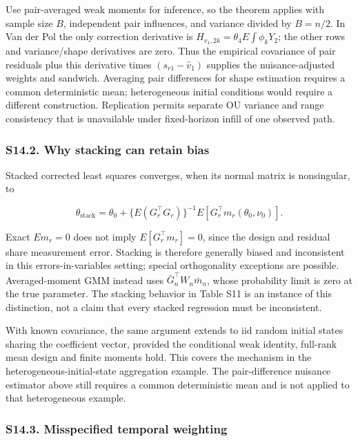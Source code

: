 \documentclass[
  11pt,
]{article}
\begin{document}
Use pair-averaged weak moments for inference, so the theorem applies
with sample size \(B\), independent pair influences, and variance
divided by \(B=n/2\). In Van der Pol the only correction derivative is
\(H_{v_1,2k}=\theta_4 E\int\phi_k Y_2\); the other rows and
variance/shape derivatives are zero. Thus the empirical covariance of
pair residuals plus this derivative times \((s_{r1}-\widehat v_1)\)
supplies the nuisance-adjusted weights and sandwich. Averaging pair
differences for shape estimation requires a common deterministic mean;
heterogeneous initial conditions would require a different construction.
Replication permits separate OU variance and range consistency that is
unavailable under fixed-horizon infill of one observed path.

\subsubsection{S14.2. Why stacking can retain
bias}\label{s14.2.-why-stacking-can-retain-bias}

Stacked corrected least squares converges, when its normal matrix is
nonsingular, to

\[
\theta_{\mathrm{stack}}=\theta_0+
\{E(G_r^\top G_r)\}^{-1}E[G_r^\top m_r(\theta_0,\nu_0)].
\]

Exact \(E m_r=0\) does not imply \(E[G_r^\top m_r]=0\), since the design
and residual share measurement error. Stacking is therefore generally
biased and inconsistent in this errors-in-variables setting; special
orthogonality exceptions are possible. Averaged-moment GMM instead uses
\(\bar G_n^\top W_n\bar m_n\), whose probability limit is zero at the
true parameter. The stacking behavior in Table S11 is an instance of
this distinction, not a claim that every stacked regression must be
inconsistent.

With known covariance, the same argument extends to iid random initial
states sharing the coefficient vector, provided the conditional weak
identity, full-rank mean design and finite moments hold. This covers the
mechanism in the heterogeneous-initial-state aggregation example. The
pair-difference nuisance estimator above still requires a common
deterministic mean and is not applied to that heterogeneous example.

\subsubsection{S14.3. Misspecified temporal
weighting}\label{s14.3.-misspecified-temporal-weighting}
\end{document}
